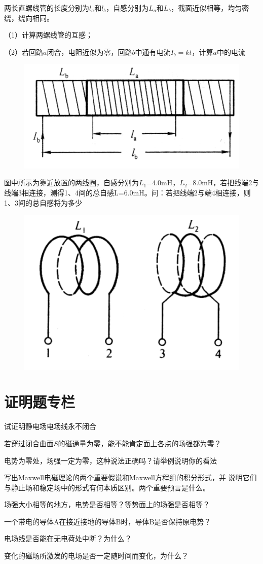 \documentclass[lang=cn,10pt]{elegantbook}
\begin{document}
	 \begin{exercise}
	 	两长直螺线管的长度分别为$l_{a}$和$l_{b}$，自感分别为$L_{a}$和$L_{b}$，截面近似相等，均匀密绕，绕向相同。
	 	
	 	（1）计算两螺线管的互感；
	 	
	 	（2）若回路$a$闭合，电阻近似为零，回路$b$中通有电流$I_{b}=kt$，计算$a$中的电流
	 	
	 	
\begin{figure}[H]
	\centering
	\includegraphics[width=0.18\linewidth]{image/图片33}
	\caption{}
	\label{fig:33}
\end{figure}
	 \end{exercise}
	 \begin{exercise}
	 	图中所示为靠近放置的两线圈，自感分别为$L_{1}$=4.0mH，$L_{2}$=8.0mH，若把线端2与线端3相连接，测得1、4间的总自感L=6.0mH。问：若把线端2与端4相连接，则1、3间的总自感将为多少
	 	
\begin{figure}[H]
	\centering
	\includegraphics[width=0.18\linewidth]{image/图片34}
	\caption{}
	\label{fig:34}
\end{figure}
	 	
	 \end{exercise}
	\chapter{证明题专栏}
	\begin{exercise}
		试证明静电场电场线永不闭合
	\end{exercise}
	\begin{exercise}
		若穿过闭合曲面$S$的磁通量为零，能不能肯定面上各点的场强都为零？
	\end{exercise}
	\begin{exercise}
		电势为零处，场强一定为零，这种说法正确吗？请举例说明你的看法
	\end{exercise}
	\begin{exercise}
		写出Maxwell电磁理论的两个重要假说和Maxwell方程组的积分形式，并
		说明它们与静止场和稳定场中的形式有何本质区别。两个重要预言是什么。
	\end{exercise}
	\begin{exercise}
		场强大小相等的地方，电势是否相等？等势面上的场强是否相等？
	\end{exercise}
	\begin{exercise}
		一个带电的导体A在接近接地的导体B时，导体B是否保持原电势？
	\end{exercise}
	\begin{exercise}
		电场线是否能在无电荷处中断？为什么？
	\end{exercise}
	\begin{exercise}
		变化的磁场所激发的电场是否一定随时间而变化，为什么？
	\end{exercise}
\end{document}
